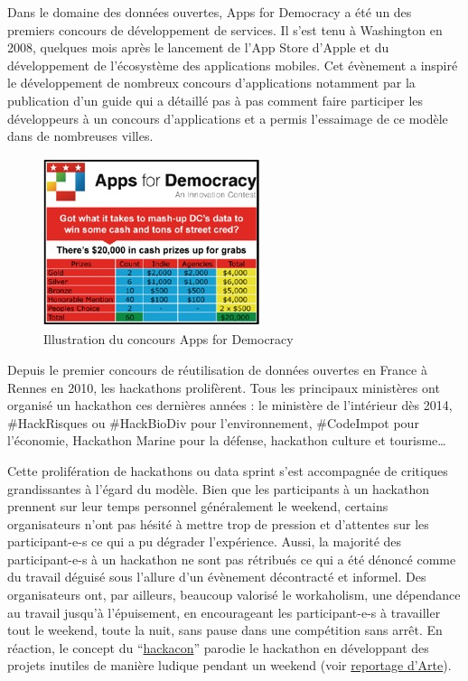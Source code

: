 \documentclass[]{book}
\begin{document}
Dans le domaine des données ouvertes, Apps for Democracy a été un des
premiers concours de développement de services. Il s'est tenu à
Washington en 2008, quelques mois après le lancement de l'App Store
d'Apple et du développement de l'écosystème des applications mobiles.
Cet évènement a inspiré le développement de nombreux concours
d'applications notamment par la publication d'un guide qui a détaillé
pas à pas comment faire participer les développeurs à un concours
d'applications et a permis l'essaimage de ce modèle dans de nombreuses
villes.

\begin{figure}

{\centering \includegraphics[width=0.3\linewidth]{./img/appsfordemocracycontest} 

}

\caption{Illustration du concours Apps for Democracy}\label{fig:unnamed-chunk-13}
\end{figure}

Depuis le premier concours de réutilisation de données ouvertes en
France à Rennes en 2010, les hackathons prolifèrent. Tous les principaux
ministères ont organisé un hackathon ces dernières années : le ministère
de l'intérieur dès 2014, \#HackRisques ou \#HackBioDiv pour
l'environnement, \#CodeImpot pour l'économie, Hackathon Marine pour la
défense, hackathon culture et tourisme\ldots{}

Cette prolifération de hackathons ou data sprint s'est accompagnée de
critiques grandissantes à l'égard du modèle. Bien que les participants à
un hackathon prennent sur leur temps personnel généralement le weekend,
certains organisateurs n'ont pas hésité à mettre trop de pression et
d'attentes sur les participant-e-s ce qui a pu dégrader l'expérience.
Aussi, la majorité des participant-e-s à un hackathon ne sont pas
rétribués ce qui a été dénoncé comme du travail déguisé sous l'allure
d'un évènement décontracté et informel. Des organisateurs ont, par
ailleurs, beaucoup valorisé le workaholism, une dépendance au travail
jusqu'à l'épuisement, en encourageant les participant-e-s à travailler
tout le weekend, toute la nuit, sans pause dans une compétition sans
arrêt. En réaction, le concept du
``\href{http://www.hackacon.fr/}{hackacon}'' parodie le hackathon en
développant des projets inutiles de manière ludique pendant un weekend
(voir \href{http://tracks.arte.tv/fr/hackacon}{reportage d'Arte}).
\end{document}
